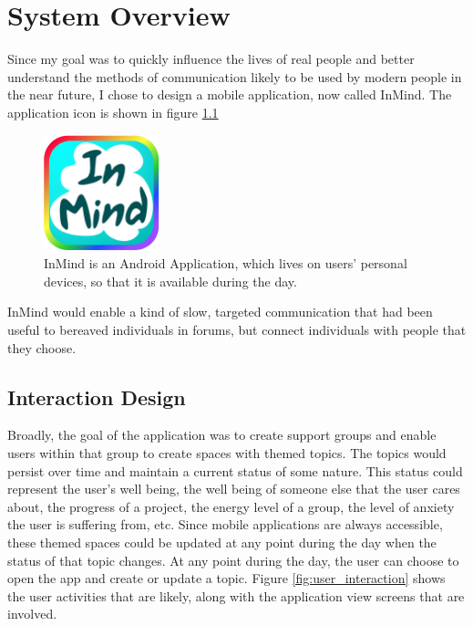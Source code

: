 \chapter{System Overview}
  Since my goal was to quickly influence the lives of real people
  and better understand the methods of communication likely to be used by
  modern people in the near future, I chose to design
  a mobile application, now called InMind.
  The application icon is shown in figure \ref{fig:application_icon}

  \begin{figure}
  \centering
  \includegraphics[width=0.3\textwidth]{inmind_logo2.png}
  \caption{InMind is an Android Application,
  which lives on users' personal devices,
  so that it is available during the day.}
  \label{fig:application_icon}
  \end{figure}

  InMind would enable a kind of slow,
  targeted communication that had been useful to bereaved individuals in forums,
  but connect individuals with people that they choose.

  \section{Interaction Design}
  Broadly, the goal of the application was to create support groups and 
  enable users within that group to create spaces
  with themed topics.
  The topics would persist over time and maintain a current status of some nature.
  This status could represent the user's well being, the well being of someone else
  that the user cares about, the progress of a project, the energy level of a group,
  the level of anxiety the user is suffering from, etc.
  Since mobile applications are always accessible,
  these themed spaces could be updated at any point
  during the day when the status of that topic changes.
  At any point during the day,
  the user can choose to open the app and create or update a topic.
  Figure \ref{fig:user_interaction} shows the user activities
  that are likely, along with the application view screens that are involved.
 
